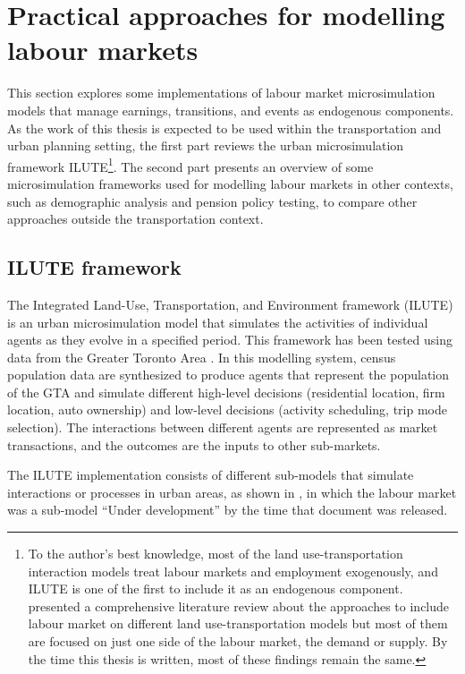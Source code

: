 \section{Practical approaches for modelling labour markets} 

This section explores some implementations of labour market microsimulation models that manage earnings, transitions, and events as endogenous components. As the work of this thesis is expected to be used within the transportation and urban planning setting, the first part reviews the urban microsimulation framework ILUTE\footnote{To the author's best knowledge, most of the land use-transportation interaction models treat labour markets and employment exogenously, and ILUTE is one of the first to include it as an endogenous component. \citet{Harmon2013} presented a comprehensive literature review about the approaches to include labour market on different land use-transportation models but most of them are focused on just one side of the labour market, the demand or supply. By the time this thesis is written, most of these findings remain the same.}. The second part presents an overview of some microsimulation frameworks used for modelling labour markets in other contexts, such as demographic analysis and pension policy testing, to compare other approaches outside the transportation context.

\subsection{ILUTE framework}\label{section:ilute}

The Integrated Land-Use, Transportation, and Environment framework (ILUTE) is an urban microsimulation model that simulates the activities of individual agents as they evolve in a specified period. This framework has been tested using data from the Greater Toronto Area \citep{Salvini2005}. In this modelling system, census population data are synthesized to produce agents that represent the population of the GTA and simulate different high-level decisions (residential location, firm location, auto ownership) and low-level decisions (activity scheduling, trip mode selection). The interactions between different agents are represented as market transactions, and the outcomes are the inputs to other sub-markets. 

The ILUTE implementation consists of different sub-models that simulate interactions or processes in urban areas, as shown in , in which the labour market was a sub-model “Under development” by the time that document was released.

